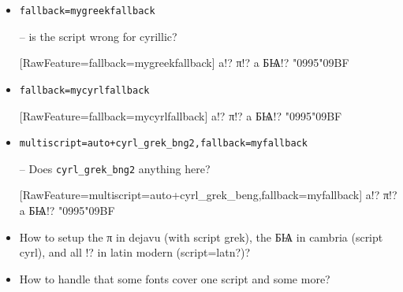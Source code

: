 \documentclass{article}
\begin{document}
\begin{itemize}
\item \verb+fallback=mygreekfallback+

-- is the script wrong for cyrillic?

[RawFeature={fallback=mygreekfallback}]
a!? π!? a БѨ!? \char"0995\char"09BF

\item \verb+fallback=mycyrlfallback+

[RawFeature={fallback=mycyrlfallback}]
a!? π!? a БѨ!? \char"0995\char"09BF

\item \verb!multiscript=auto+cyrl_grek_bng2,fallback=myfallback!

-- Does \verb+cyrl_grek_bng2+ anything here?

[RawFeature={multiscript=auto+cyrl_grek_beng,fallback=myfallback}]
a!? π!? a БѨ!? \char"0995\char"09BF


\item How to setup the π in dejavu (with script grek), the БѨ in cambria (script cyrl), and all !? in latin modern (script=latn?)?

\item How to handle that some fonts cover one script and some more?
\end{itemize}
\end{document}
